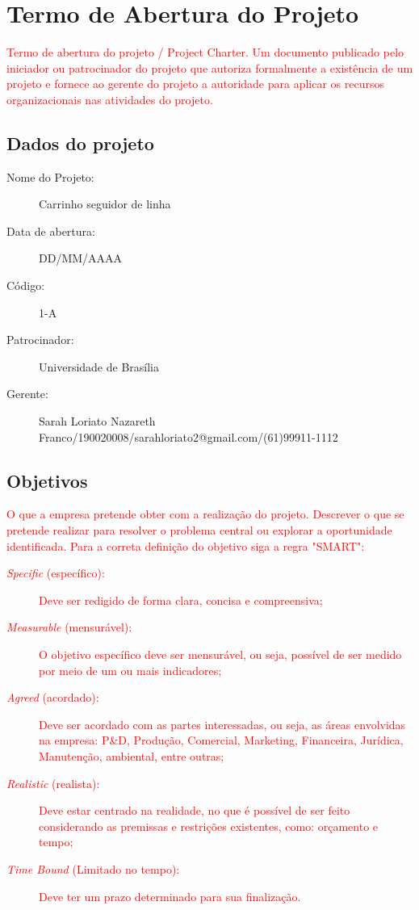\chapter{Termo de Abertura do Projeto}

\textcolor{red}{Termo de abertura do projeto / Project Charter. Um documento publicado pelo iniciador ou patrocinador do projeto que autoriza formalmente a existência de um projeto e fornece ao gerente do projeto a autoridade para aplicar os recursos organizacionais nas atividades do projeto.}

\section{Dados do projeto}
\begin{description}
    \item [Nome do Projeto:] Carrinho seguidor de linha
    \item [Data de abertura:] DD/MM/AAAA
    \item [Código:] 1-A
    \item [Patrocinador:] Universidade de Brasília
    \item [Gerente:] Sarah Loriato Nazareth Franco/190020008/sarahloriato2@gmail.com/(61)99911-1112
\end{description}

\section{Objetivos}
\textcolor{red} {O que a empresa pretende obter com a realização do projeto. Descrever o que se pretende realizar para resolver o problema central ou explorar a oportunidade identificada. Para a correta definição do objetivo siga a regra "SMART":
\begin{description}
    \item [\textit{Specific} (específico):] Deve ser redigido de forma clara, concisa e compreensiva;
    \item [\textit{Measurable} (mensurável):] O objetivo específico deve ser mensurável, ou seja, 
possível de ser medido por meio de um ou mais indicadores;
    \item [\textit{Agreed} (acordado):] Deve ser acordado com as partes interessadas, ou seja, as áreas envolvidas na empresa: P\&D, Produção, Comercial, Marketing, Financeira, Jurídica, Manutenção, ambiental, entre outras;
    \item [\textit{Realistic} (realista):] Deve estar centrado na realidade, no que é possível de ser feito considerando as premissas e restrições existentes, como: orçamento e tempo;
    \item [\textit{Time Bound} (Limitado no tempo):] Deve ter um prazo determinado para sua finalização.
\end{description}
}

